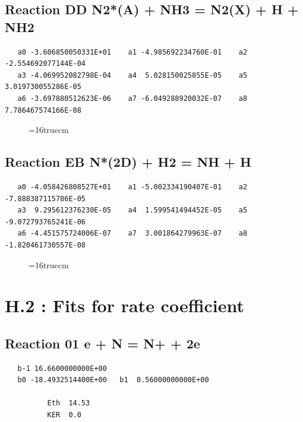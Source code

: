 \documentclass[12pt]{article}
\begin{document}
\subsection{
Reaction DD N2*(A) + NH3 =  N2(X) + H + NH2}
\begin{small}\begin{verbatim}
   a0 -3.606850050331E+01    a1 -4.985692234760E-01    a2 -2.554692077144E-04
   a3 -4.069952082798E-04    a4  5.028150025855E-05    a5  3.019730055286E-05
   a6 -3.697880512623E-06    a7 -6.049288920032E-07    a8  7.786467574166E-08
   \end{verbatim}\end{small}
\begin{figure}[h!] \label{n2rates}
\epsfxsize=16truecm
\end{figure}
\newpage

\subsection{
Reaction EB N*(2D) + H2  = NH + H}
\begin{small}\begin{verbatim}
   a0 -4.058426808527E+01    a1 -5.002334190407E-01    a2 -7.888387115786E-05
   a3  9.295612376230E-05    a4  1.599541494452E-05    a5 -9.072793765241E-06
   a6 -4.451575724006E-07    a7  3.001864279963E-07    a8 -1.820461730557E-08
   \end{verbatim}\end{small}
\begin{figure}[h!] \label{n2rates}
\epsfxsize=16truecm
\end{figure}
\newpage


\section{H.2 : Fits for rate coefficient }

\subsection{
Reaction 01 e + N = N+ + 2e }
\begin{small}\begin{verbatim}
   b-1 16.6600000000E+00
   b0 -18.4932514400E+00   b1  0.56000000000E+00

          Eth  14.53
          KER  0.0

\end{verbatim}\end{small}
\newpage
\end{document}
